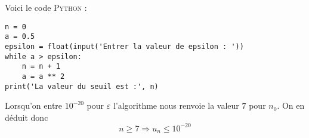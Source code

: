 \documentclass[a4paper,11pt,cours]{nsi} %
\begin{document}
Voici le code \textsc{Python} :
\begin{pyc}
	\begin{verbatim}
n = 0
a = 0.5
epsilon = float(input('Entrer la valeur de epsilon : '))
while a > epsilon:
   	n = n + 1
   	a = a ** 2
print('La valeur du seuil est :', n)
	\end{verbatim}
\end{pyc}


Lorsqu'on entre $10^{-20}$ pour $\varepsilon$ l'algorithme nous renvoie la valeur $7$ pour $n_0$.
On en déduit donc $$n\geqslant 7 \Longrightarrow u_n\leqslant 10^{-20}$$
\end{document}

